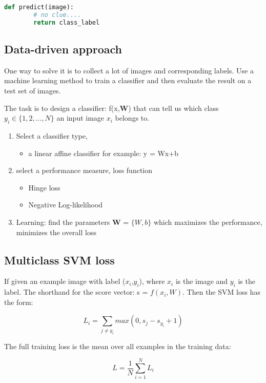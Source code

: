 	 \begin{lstlisting}[language=Python]
	 def predict(image):
	 	# no clue....
	 	return class_label
	 \end{lstlisting}

\subsection*{Data-driven approach}
One way to solve it is to collect a lot of images and corresponding labels. Use a machine learning method to train a classifier and then evaluate the result on a test set of images. 

The task is to design a classifier: f(x,\textbf{W}) that can tell us which class $y_i \in \{ 1,2,...,N\}$ an input image $x_i$ belongs to.

	\begin{enumerate}
		\item Select a classifier type, 
		\begin{itemize}
			\item a linear affine classifier for example: y = Wx+b
		\end{itemize}
		\item select a performance measure, loss function
			\begin{itemize}
				\item Hinge loss
				\item Negative Log-likelihood 
			\end{itemize}
		\item Learning: find the parameters \textbf{W} = $\{W,b\}$ which maximizes the performance, minimizes the overall loss
	\end{enumerate}


\subsection*{Multiclass SVM loss}
If given an example image with label ($x_i$,$y_i$), where $x_i$ is the image and $y_i$ is the label. The shorthand for the score vector: s = $f(x_i,W)$. Then the SVM loss has the form:

	\begin{equation}
		L_i = \sum_{j \neq y_i}^{} max(0, s_j-s_{y_i} +1) 
	\end{equation}

The full training loss is the mean over all examples in the training data:

	\begin{equation}
		L = \frac{1} {N} \sum_{i=1}^{N} L_i
	\end{equation}


